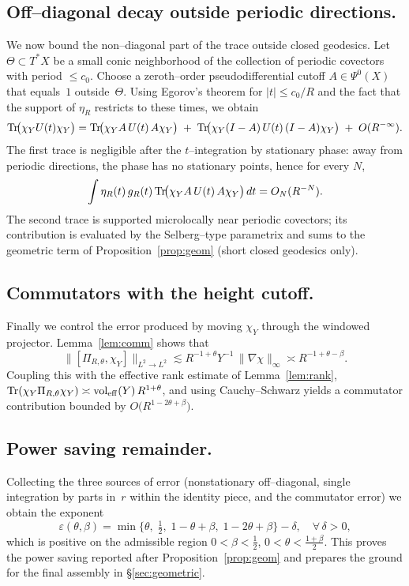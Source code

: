\subsection{Off--diagonal decay outside periodic directions.}
We now bound the non--diagonal part of the trace outside closed geodesics.
Let $\Theta\subset T^*X$ be a small conic neighborhood of the collection of
periodic covectors with period $\le c_0$. Choose a zeroth--order
pseudodifferential cutoff $A\in\Psi^0(X)$ that equals~$1$ outside~$\Theta$.
Using Egorov's theorem for $|t|\le c_0/R$ and the fact that the support of
$\eta_R$ restricts to these times, we obtain
\[
\mathrm{Tr}\!\big(\chi_Y U(t)\chi_Y\big)
= \mathrm{Tr}\!\big(\chi_Y A\,U(t)\,A\chi_Y\big) \;+\; \mathrm{Tr}\!\big(\chi_Y (I-A)\,U(t)\,(I-A)\chi_Y\big)
\;+\; O(R^{-\infty}).
\]
The first trace is negligible after the $t$--integration by stationary phase:
away from periodic directions, the phase has no stationary points, hence for
every $N$,
\[
\int \eta_R(t)\, g_R(t)\, \mathrm{Tr}\!\big(\chi_Y A\,U(t)\,A\chi_Y\big)\,dt
= O_N(R^{-N}).
\]
The second trace is supported microlocally near periodic covectors; its
contribution is evaluated by the Selberg--type parametrix and sums to the
geometric term of Proposition~\ref{prop:geom} (short closed geodesics only).

\subsection{Commutators with the height cutoff.}
Finally we control the error produced by moving $\chi_Y$ through the
windowed projector. Lemma~\ref{lem:comm} shows that
\[
\big\|[\Pi_{R,\theta},\chi_Y]\big\|_{L^2\to L^2}
\lesssim R^{-1+\theta} Y^{-1} \,\|\nabla\chi\|_\infty
\asymp R^{-1+\theta-\beta}.
\]
Coupling this with the effective rank estimate of
Lemma~\ref{lem:rank}, $\mathrm{Tr}(\chi_Y \Pi_{R,\theta}\chi_Y)\asymp
\operatorname{vol}_{\mathrm{eff}}(Y)\,R^{1+\theta}$, and using Cauchy--Schwarz yields
a commutator contribution bounded by $O\!\big(R^{1-2\theta+\beta}\big)$.

\subsection{Power saving remainder.}
Collecting the three sources of error (nonstationary off--diagonal,
single integration by parts in~$r$ within the identity piece,
and the commutator error) we obtain the exponent
\[
\varepsilon(\theta,\beta)
=\min\Big\{\theta,\; \tfrac12,\; 1-\theta+\beta,\; 1-2\theta+\beta\Big\}
-\delta,\quad \forall\,\delta>0,
\]
which is positive on the admissible region
$0<\beta<\tfrac12$, $0<\theta<\tfrac{1+\beta}{2}$. This proves the
power saving reported after Proposition~\ref{prop:geom} and prepares
the ground for the final assembly in \S\ref{sec:geometric}.
